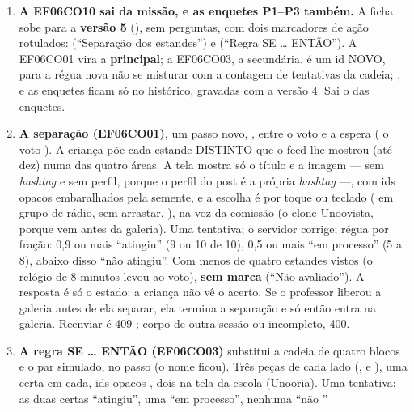 \begin{enumerate}
  \item \textbf{A EF06CO10 sai da missão, e as enquetes P1--P3 também.} A ficha
    sobe para a \textbf{versão 5} (), sem
    perguntas, com dois marcadores de ação rotulados: 
    (\enquote{Separação dos estandes}) e  (\enquote{Regra SE \ldots{}
    ENTÃO}). A EF06CO01 vira a \textbf{principal}; a EF06CO03, a secundária.
     é um id NOVO, para a régua nova não se misturar com a contagem
    de tentativas da cadeia; ,  e as enquetes ficam só
    no histórico, gravadas com a versão 4. Sai o  das
    enquetes.
  \item \textbf{A separação (EF06CO01)}, um passo novo, ,
    entre o voto e a espera ( \seta{} o voto \seta{}
     \seta{}  \seta{}  \seta{}
     \seta{}  \seta{}  \seta{} ).
    A criança põe cada estande DISTINTO que o feed lhe mostrou (até dez) numa
    das quatro áreas. A tela mostra só o título e a imagem --- sem
    \emph{hashtag} e sem perfil, porque o perfil do post é a própria
    \emph{hashtag} ---, com ids opacos  embaralhados pela semente, e
    a escolha é por toque ou teclado ( em grupo de rádio, sem arrastar,
    ), na voz da comissão (o clone Unoovista, porque vem antes da
    galeria). Uma tentativa; o servidor corrige; régua por fração: 0,9 ou mais
    \enquote{atingiu} (9 ou 10 de 10), 0,5 ou mais \enquote{em processo} (5 a
    8), abaixo disso \enquote{não atingiu}. Com menos de quatro estandes vistos
    (o relógio de 8 minutos levou ao voto), \textbf{sem marca}
    (\enquote{Não avaliado}). A resposta é só o estado: a criança não vê o
    acerto. Se o professor liberou a galeria antes de ela separar, ela termina a
    separação e só então entra na galeria. Reenviar é 409
    ; corpo de outra sessão ou incompleto, 400.
  \item \textbf{A regra SE \ldots{} ENTÃO (EF06CO03)} substitui a cadeia de
    quatro blocos e o par simulado, no passo  (o nome ficou). Três
    peças de cada lado (,  e
    ), uma certa em cada, ids opacos , dois
     na tela da escola (Unooria). Uma tentativa: as duas certas
    \enquote{atingiu}, uma \enquote{em processo}, nenhuma \enquote{não
}
\end{enumerate}
